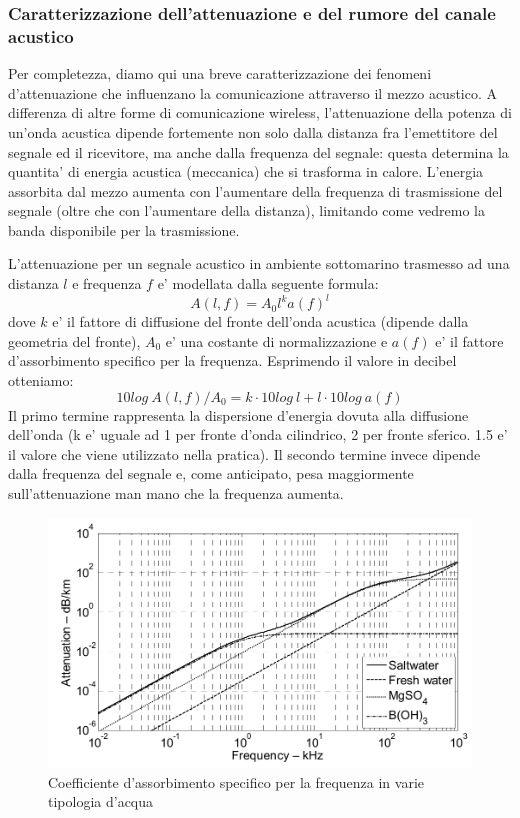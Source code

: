 \subsubsection{Caratterizzazione dell'attenuazione e del rumore del canale acustico}
\par
Per completezza, diamo qui una breve caratterizzazione dei fenomeni d'attenuazione che influenzano la comunicazione attraverso il mezzo acustico. A differenza di altre forme di comunicazione wireless, l'attenuazione della potenza di un'onda acustica dipende fortemente non solo dalla distanza fra l'emettitore del segnale ed il ricevitore, ma anche dalla frequenza del segnale: questa determina la quantita' di energia acustica (meccanica) che si trasforma in calore. L'energia assorbita dal mezzo aumenta con l'aumentare della frequenza di trasmissione del segnale (oltre che con l'aumentare della distanza), limitando come vedremo la banda disponibile per la trasmissione.

L'attenuazione per un segnale acustico in ambiente sottomarino trasmesso ad una distanza $l$ e frequenza $f$ e' modellata dalla seguente formula:
\[A(l, f) = A_0 l^k a(f)^l\]
dove $k$ e' il fattore di diffusione del fronte dell'onda acustica (dipende dalla geometria del fronte), $A_0$ e' una costante di normalizzazione e $a(f)$ e' il fattore d'assorbimento specifico per la frequenza.
Esprimendo il valore in decibel otteniamo:
\[10log\ A(l, f)/A_0 = k \cdot 10log\ l + l \cdot 10log\ a(f)\]
Il primo termine rappresenta la dispersione d'energia dovuta alla diffusione dell'onda (k e' uguale ad 1 per fronte d'onda cilindrico, 2 per fronte sferico. 1.5 e' il valore che viene utilizzato nella pratica). Il secondo termine invece dipende dalla frequenza del segnale e, come anticipato, pesa maggiormente sull'attenuazione man mano che la frequenza aumenta.

\begin{figure}[H]
    \centering
    \includegraphics[scale=1.4]{waterabsorption.jpeg}
    \caption{Coefficiente d'assorbimento specifico per la frequenza in varie tipologia d'acqua}
\end{figure}

